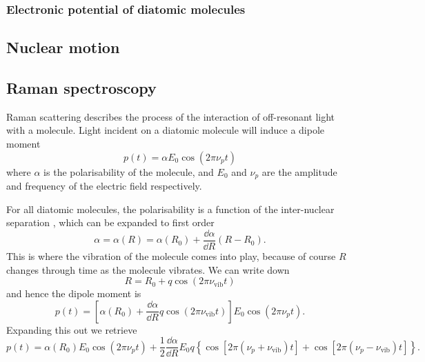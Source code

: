 

\subsubsection{Electronic potential of diatomic molecules}



\subsection{Nuclear motion}

\subsection{Raman spectroscopy}

Raman scattering describes the process of the interaction of off-resonant light
with a molecule.  Light incident on a diatomic molecule will induce a dipole
moment
%
\begin{equation}
  p(t) = \alpha E_0 \cos(2\pi\nu_p t)
\end{equation}
%
where $\alpha$ is the polarisability of the molecule, and $E_0$ and $\nu_p$ are
the amplitude and frequency of the electric field respectively.

For all diatomic molecules, the polarisability is a function of the
inter-nuclear separation \cite{}, which can be expanded to first order
%
\begin{equation}
\alpha = \alpha(R) = \alpha(R_0) + \frac{\dd \alpha}{\dd R}(R - R_0).
\end{equation}
%
This is where the vibration of the molecule comes into play, because of course
$R$ changes through time as the molecule vibrates. We can write down
%
\begin{equation}
R = R_0 + q \cos (2\pi \nu_\text{vib} t)
\end{equation}
and hence the dipole moment is
\begin{equation}
p(t) = \left[ \alpha(R_0) + \frac{\dd \alpha}{\dd R} q\cos (2\pi\nu_\text{vib}t)
\right] E_0 \cos(2\pi\nu_p t).
\end{equation}
Expanding this out we retrieve
\begin{equation}
p(t) = \alpha(R_0)E_0\cos(2\pi\nu_p t) + \frac{1}{2}\frac{\dd \alpha}{\dd R}
E_0 q \left\{ \cos\left[ 2\pi(\nu_p + \nu_\text{vib})t\right]
+ \cos\left[ 2\pi(\nu_p - \nu_\text{vib})t\right] \right\}.
\end{equation}

